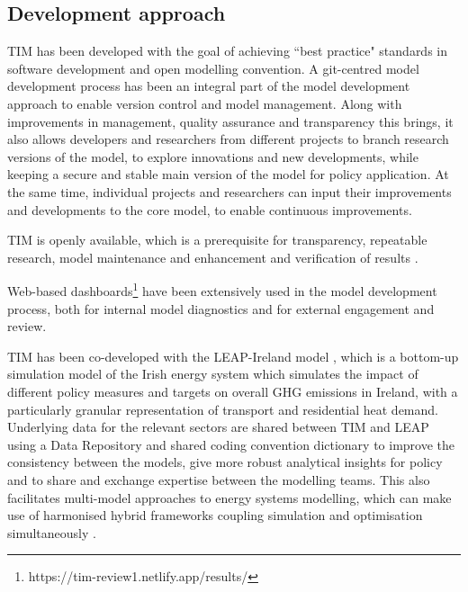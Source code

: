 \documentclass[journal abbreviation, manuscript]{copernicus}
\begin{document}
\subsection{Development approach}
\label{ss:model_dev}


TIM has been developed with the goal of achieving ``best practice" standards in software development and open modelling convention. A git-centred model development process has been an integral part of the model development approach to enable version control and model management. Along with improvements in management, quality assurance and transparency this brings, it also allows developers and researchers from different projects to branch research versions of the model, to explore innovations and new developments, while keeping a secure and stable main version of the model for policy application. At the same time, individual projects and researchers can input their improvements and developments to the core model, to enable continuous improvements. 

TIM is openly available, which is a prerequisite for transparency, repeatable research, model maintenance and enhancement and verification of results \cite{Pfenninger2018}. 

Web-based dashboards\footnote{https://tim-review1.netlify.app/results/} have been extensively used in the model development process, both for internal model diagnostics and for external engagement and review. 

TIM has been co-developed with the LEAP-Ireland model \cite{MacUidhir2020}, which is a bottom-up simulation model of the Irish energy system which simulates the impact of different policy measures and targets on overall GHG emissions in Ireland, with a particularly granular representation of transport and residential heat demand. Underlying data for the relevant sectors are shared between TIM and LEAP using a Data Repository and shared coding convention dictionary to improve the consistency between the models, give more robust analytical insights for policy and to share and exchange expertise between the modelling teams. This also facilitates multi-model approaches to energy systems modelling, which can make use of harmonised hybrid frameworks coupling simulation and optimisation simultaneously \cite{rogan2014leaps}.
\end{document}
